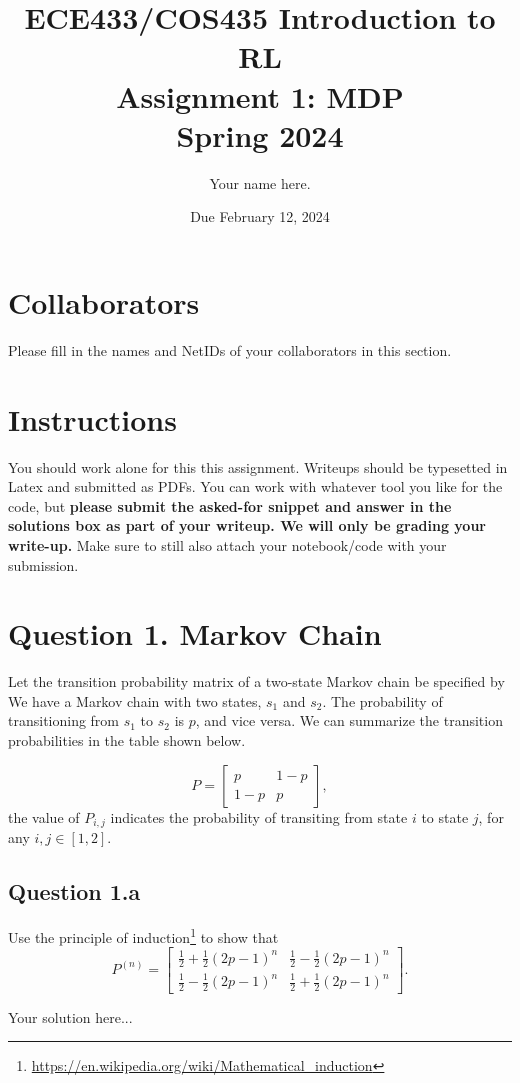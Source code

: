 \documentclass[12pt]{article}
\date{Due February 12, 2024}
\author{\begin{fillme}[width=0.3\textwidth]
 Your name here.
\end{fillme}} %
\title{ECE433/COS435 Introduction to RL\\
  Assignment 1: MDP\\
  Spring 2024\\
}
\begin{document}
  \maketitle
  \section*{Collaborators}
\begin{fillme}
 Please fill in the names and NetIDs of your collaborators in this section.
\end{fillme}

\section*{Instructions}

You should work alone for this this assignment. Writeups should be typesetted in Latex and submitted as PDFs. You can work with whatever tool you like for the code, but \textbf{please submit the asked-for snippet and answer in the solutions box as part of your writeup. We will only be grading your write-up.} Make sure to still also attach your notebook/code with your submission.

\section*{Question 1. Markov Chain}
Let the transition probability matrix of a two-state Markov chain be specified by
We have a Markov chain with two states, $s_1$ and $s_2$. The probability of transitioning from $s_1$ to $s_2$ is $p$, and vice versa. We can summarize the transition probabilities in the table shown below.

\[
P = \begin{bmatrix}
p & 1 - p \\
1 - p & p 
\end{bmatrix},
\]
the value of $P_{i,j}$ indicates the probability of transiting from state $i$ to state $j$, for any $i,j \in [1,2]$.

 \subsection*{Question 1.a} Use the principle of induction\footnote{\url{https://en.wikipedia.org/wiki/Mathematical_induction}} to show that
\[
P^{(n)} = \begin{bmatrix}
\frac{1}{2} + \frac{1}{2}(2p - 1)^n & \frac{1}{2} - \frac{1}{2}(2p - 1)^n \\
\frac{1}{2} - \frac{1}{2}(2p - 1)^n & \frac{1}{2} + \frac{1}{2}(2p - 1)^n
\end{bmatrix}.
\]
\begin{solution}
Your solution here...
\end{solution}
\end{document}
